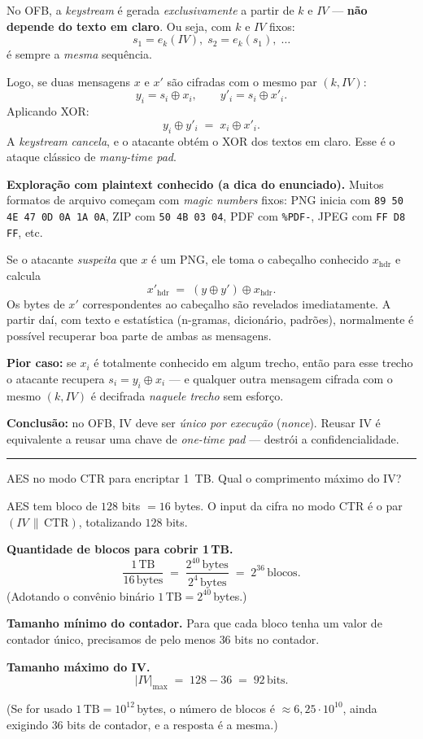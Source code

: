 \documentclass[12pt,a4paper]{article}
\newcommand{\exercicio}[1]{%
    \par\vspace{1.2em}
    \noindent
    {\color{black!55}\rule[-0.25em]{3pt}{1.6em}}%
    \hspace{0.6em}{\Large\bfseries Exerc\'{i}cio #1}
    \par\vspace{-0.4em}
    \noindent{\color{black!35}\rule{\textwidth}{0.4pt}}
    \par\vspace{0.35em}
}
\newenvironment{resposta}{%
    \begin{respostabox}
    \color{red!70!black}\sloppy
}{%
    \end{respostabox}
}
\begin{document}
\begin{resposta}

No OFB, a \textit{keystream} é gerada \emph{exclusivamente} a partir de $k$ e $IV$ — \textbf{não depende do texto em claro}. Ou seja, com $k$ e $IV$ fixos:
\[
s_1 = e_k(IV),\; s_2 = e_k(s_1),\;\ldots
\]
é sempre a \emph{mesma} sequência.

Logo, se duas mensagens $x$ e $x'$ são cifradas com o mesmo par $(k, IV)$:
\[
y_i = s_i \oplus x_i, \qquad y'_i = s_i \oplus x'_i.
\]
Aplicando XOR:
\[
y_i \oplus y'_i \;=\; x_i \oplus x'_i.
\]
A \textit{keystream} \emph{cancela}, e o atacante obtém o XOR dos textos em claro. Esse é o ataque clássico de \emph{many-time pad}.

\textbf{Exploração com plaintext conhecido (a dica do enunciado).} Muitos formatos de arquivo começam com \emph{magic numbers} fixos: PNG inicia com \texttt{89\,50\,4E\,47\,0D\,0A\,1A\,0A}, ZIP com \texttt{50\,4B\,03\,04}, PDF com \texttt{\%PDF-}, JPEG com \texttt{FF\,D8\,FF}, etc.

Se o atacante \emph{suspeita} que $x$ é um PNG, ele toma o cabeçalho conhecido $x_{\text{hdr}}$ e calcula
\[
x'_{\text{hdr}} \;=\; (y \oplus y') \oplus x_{\text{hdr}}.
\]
Os bytes de $x'$ correspondentes ao cabeçalho são revelados imediatamente. A partir daí, com texto e estatística (n-gramas, dicionário, padrões), normalmente é possível recuperar boa parte de ambas as mensagens.

\textbf{Pior caso:} se $x_i$ é totalmente conhecido em algum trecho, então para esse trecho o atacante recupera $s_i = y_i \oplus x_i$ — e qualquer outra mensagem cifrada com o mesmo $(k, IV)$ é decifrada \emph{naquele trecho} sem esforço.

\textbf{Conclusão:} no OFB, IV deve ser \emph{único por execução} (\textit{nonce}). Reusar IV é equivalente a reusar uma chave de \textit{one-time pad} — destrói a confidencialidade.

\end{resposta}

\exercicio{13}
AES no modo CTR para encriptar 1~TB. Qual o comprimento máximo do IV?

\begin{resposta}

AES tem bloco de $128$ bits $= 16$ bytes. O input da cifra no modo CTR é o par $(IV \,\|\, \mathrm{CTR})$, totalizando $128$ bits.

\textbf{Quantidade de blocos para cobrir 1\,TB.}
\[
\frac{1\,\mathrm{TB}}{16\,\text{bytes}} \;=\; \frac{2^{40}\,\text{bytes}}{2^4\,\text{bytes}} \;=\; 2^{36}\,\text{blocos}.
\]
(Adotando o convênio binário $1\,\mathrm{TB}=2^{40}$\,bytes.)

\textbf{Tamanho mínimo do contador.} Para que cada bloco tenha um valor de contador único, precisamos de pelo menos $36$ bits no contador.

\textbf{Tamanho máximo do IV.}
\[
\boxed{\,|IV|_{\max} \;=\; 128 - 36 \;=\; 92\,\text{bits}.\,}
\]

(Se for usado $1\,\mathrm{TB}=10^{12}$\,bytes, o número de blocos é $\approx 6{,}25 \cdot 10^{10}$, ainda exigindo $36$ bits de contador, e a resposta é a mesma.)

\end{resposta}
\end{document}
